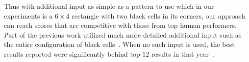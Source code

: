 Thus with additional input as simple as a pattern to use which in our experiments is a $6 \times 4$ rectangle with two black cells in its corners, our approach can reach scores that are competitive with those from top human performers. Part of the previous work utilized much more detailed additional input such as the entire configuration of black cells~\cite{DBLP:conf/socs/BoteaB21}. When no such input is used, the best results reported were significantly behind top-12 results in that
year~\cite{DBLP:conf/cig/BulitkoB21,Botea_Bulitko_2022}.


